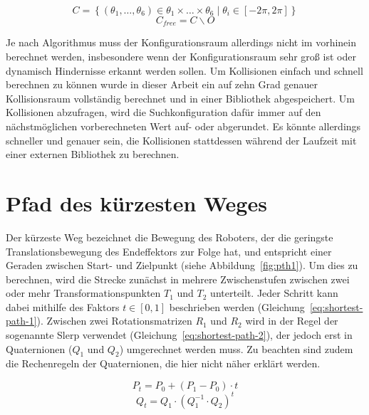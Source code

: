 \begin{equation}
    \mathit{C} = \left\{ \left( \theta_1,\dots,\theta_6 \right) \in \theta_1\times\dots\times\theta_6 \mid \theta_i \in \left[ -2\pi, 2\pi \right]\right\}
    \label{eq:config-1}
\end{equation}
\begin{equation}
    \mathit{C}_{free} = \mathit{C}\backslash\mathit{O}
    \label{eq:config-2}
\end{equation}

Je nach Algorithmus muss der Konfigurationsraum allerdings nicht im vorhinein berechnet werden, insbesondere wenn der Konfigurationsraum sehr groß ist oder dynamisch Hindernisse erkannt werden sollen.
Um Kollisionen einfach und schnell berechnen zu können wurde in dieser Arbeit ein auf zehn Grad genauer Kollisionsraum vollständig berechnet und in einer Bibliothek abgespeichert.
Um Kollisionen abzufragen, wird die Suchkonfiguration dafür immer auf den nächstmöglichen vorberechneten Wert auf- oder abgerundet.
Es könnte allerdings schneller und genauer sein, die Kollisionen stattdessen während der Laufzeit mit einer externen Bibliothek zu berechnen.


\section{Pfad des kürzesten Weges}\label{sec:kurzesterweg}

Der kürzeste Weg bezeichnet die Bewegung des Roboters, der die geringste Translationsbewegung des Endeffektors zur Folge hat, und entspricht einer Geraden zwischen Start- und Zielpunkt (siehe Abbildung~\ref{fig:pth1}).
Um dies zu berechnen, wird die Strecke zunächst in mehrere Zwischenstufen zwischen zwei oder mehr Transformationspunkten $T_1$ und $T_2$ unterteilt.
Jeder Schritt kann dabei mithilfe des Faktors $t \in \left[0,1\right]$ beschrieben werden (Gleichung~\ref{eq:shortest-path-1}).
Zwischen zwei Rotationsmatrizen $R_1$ und $R_2$  wird in der Regel der sogenannte Slerp verwendet  (Gleichung~\ref{eq:shortest-path-2}), der jedoch erst in Quaternionen ($Q_1$ und $Q_2$) umgerechnet werden muss.
Zu beachten sind zudem die Rechenregeln der Quaternionen, die hier nicht näher erklärt werden.

\begin{equation}
    P_{t} = P_0 + \left( P_1 - P_0 \right) \cdot t
    \label{eq:shortest-path-1}
\end{equation}
\begin{equation}
    Q_{t} = Q_1 \cdot \left( Q_1^{-1} \cdot Q_2 \right)^t
    \label{eq:shortest-path-2}
\end{equation}

